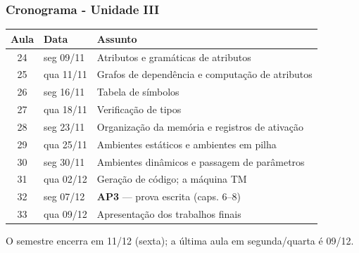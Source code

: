 \documentclass[table]{beamer}
\begin{document}
\begin{frame}
   \frametitle{Cronograma - Unidade III}
   \scriptsize
   \begin{center}
   \begin{tabular}{@{}cl p{6.6cm}@{}}
      \toprule
      \textbf{Aula} & \textbf{Data} & \textbf{Assunto} \\
      \midrule
      24 & seg 09/11 & Atributos e gramáticas de atributos \\
      25 & qua 11/11 & Grafos de dependência e computação de atributos \\
      26 & seg 16/11 & Tabela de símbolos \\
      27 & qua 18/11 & Verificação de tipos \\
      28 & seg 23/11 & Organização da memória e registros de ativação \\
      29 & qua 25/11 & Ambientes estáticos e ambientes em pilha \\
      30 & seg 30/11 & Ambientes dinâmicos e passagem de parâmetros \\
      31 & qua 02/12 & Geração de código; a máquina TM \\
      32 & seg 07/12 & \textbf{AP3} --- prova escrita (caps. 6--8) \\
      33 & qua 09/12 & Apresentação dos trabalhos finais \\
      \bottomrule
   \end{tabular}
   \end{center}
   \vspace{0.2cm}
   \footnotesize
   O semestre encerra em 11/12 (sexta); a última aula em segunda/quarta é 09/12.
\end{frame}
\end{document}
